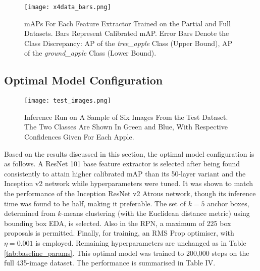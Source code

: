 \documentclass[journal]{IEEEtran}
\begin{document}
\begin{figure}[H]
    \centering
    \texttt{[image: x4data\_bars.png]}
    \caption{mAPs For Each Feature Extractor Trained on the Partial and Full Datasets. Bars Represent Calibrated mAP. Error Bars Denote the Class Discrepancy: AP of the \textit{tree\_apple} Class (Upper Bound), AP of the \textit{ground\_apple} Class (Lower Bound).}
    \label{fig:x4data_bars}
\end{figure}















\subsection{Optimal Model Configuration}

\begin{figure*}[!b]
    \centering
    \texttt{[image: test\_images.png]}
    \caption{Inference Run on A Sample of Six Images From the Test Dataset. The Two Classes Are Shown In Green and Blue, With Respective Confidences Given For Each Apple.}
    \label{fig:test_images}
\end{figure*}



Based on the results discussed in this section, the optimal model configuration is as follows. A ResNet 101 base feature extractor is selected after being found consistently to attain higher calibrated mAP than its 50-layer variant and the Inception v2 network while hyperparameters were tuned. It was shown to match the performance of the Inception ResNet v2 Atrous network, though its inference time was found to be half, making it preferable. The set of $k=5$ anchor boxes, determined from $k$-means clustering (with the Euclidean distance metric) using bounding box EDA, is selected. Also in the RPN, a maximum of 225 box proposals is permitted. Finally, for training, an RMS Prop optimiser, with $\eta=0.001$ is employed. Remaining hyperparameters are unchanged as in Table \ref{tab:baseline_params}. This optimal model was trained to 200,000 steps on the full 435-image dataset. The performance is summarised in Table IV. 

\end{document}
